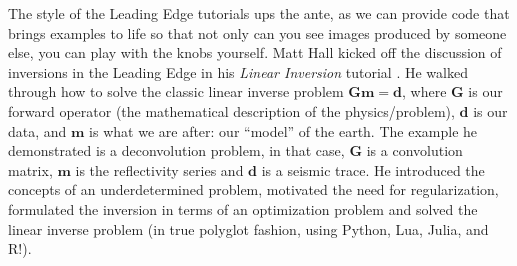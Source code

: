 \documentclass[11pt,oneside]{article}
\begin{document}
The style of the Leading Edge tutorials ups the ante, as we can provide code that brings examples to life so that not only can you see images produced by someone else, you can play with the knobs yourself. Matt Hall kicked off the discussion of inversions in the Leading Edge in his \emph{Linear Inversion} tutorial \citep{HallTutorial}. He walked through how to solve the classic linear inverse problem $\mathbf{G}\mathbf{m} = \mathbf{d}$, where $\mathbf{G}$ is our forward operator (the mathematical description of the physics/problem), $\mathbf{d}$ is our data, and $\mathbf{m}$ is what we are after: our ``model'' of the earth. The example he demonstrated is a deconvolution problem, in that case, $\mathbf{G}$ is a convolution matrix, $\mathbf{m}$ is the reflectivity series and $\mathbf{d}$ is a seismic trace. He introduced the concepts of an underdetermined problem, motivated the need for regularization, formulated the inversion in terms of an optimization problem and solved the linear inverse problem (in true polyglot fashion, using Python, Lua, Julia, and R!).
\end{document}
